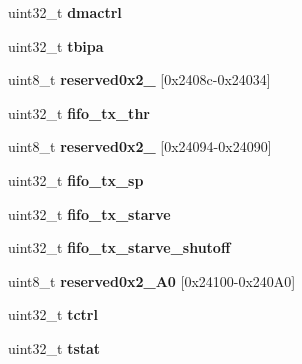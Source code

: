 \begin{DoxyCompactItemize}
uint32\+\_\+t {\bfseries dmactrl}
\item 
\mbox{\label{structtsec__registers_a7edfcce4aa70af075ccc0d94edde0548}} 
uint32\+\_\+t {\bfseries tbipa}
\item 
\mbox{\label{structtsec__registers_adf670d58578aea8b729079354d6ebb21}} 
uint8\+\_\+t {\bfseries reserved0x2\+\_} \mbox{[}0x2408c-\/0x24034\mbox{]}
\item 
\mbox{\label{structtsec__registers_ae5df61d36c8f441e527e8f2bcbe6f994}} 
uint32\+\_\+t {\bfseries fifo\+\_\+tx\+\_\+thr}
\item 
\mbox{\label{structtsec__registers_aef99071f23363f78c60971a1903ff834}} 
uint8\+\_\+t {\bfseries reserved0x2\+\_} \mbox{[}0x24094-\/0x24090\mbox{]}
\item 
\mbox{\label{structtsec__registers_a5700b7876ac5af806243322c3e3350b1}} 
uint32\+\_\+t {\bfseries fifo\+\_\+tx\+\_\+sp}
\item 
\mbox{\label{structtsec__registers_a8a97c619723405b1637becf0ca5e12c9}} 
uint32\+\_\+t {\bfseries fifo\+\_\+tx\+\_\+starve}
\item 
\mbox{\label{structtsec__registers_a97c4db5715be9afd06281733166ef21d}} 
uint32\+\_\+t {\bfseries fifo\+\_\+tx\+\_\+starve\+\_\+shutoff}
\item 
\mbox{\label{structtsec__registers_a1954e5ad65af4ae6cb7bfeb68ec5604e}} 
uint8\+\_\+t {\bfseries reserved0x2\+\_\+A0} \mbox{[}0x24100-\/0x240\+A0\mbox{]}
\item 
\mbox{\label{structtsec__registers_ae202503a2dce963483ab734783a946e7}} 
uint32\+\_\+t {\bfseries tctrl}
\item 
\mbox{\label{structtsec__registers_a85f0cb4e797ffa429eb43a8286a625f3}} 
uint32\+\_\+t {\bfseries tstat}
\item 
\mbox{\label{structtsec__registers_a52383360dc11fdde9895a9f78719d273}} 

\end{DoxyCompactItemize}
